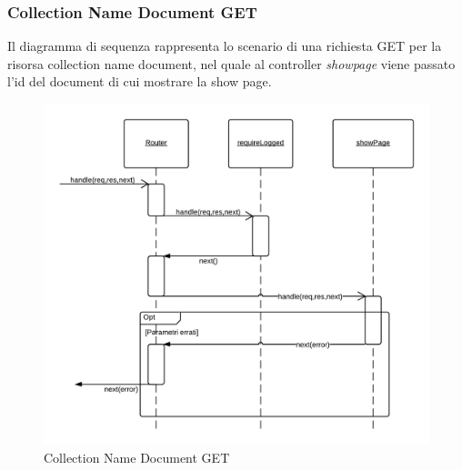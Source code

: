 \subsubsection{Collection Name Document GET} 
Il diagramma di sequenza rappresenta lo scenario di una richiesta GET per la risorsa collection name document, nel quale al controller \emph{showpage} viene passato l'id del document di cui mostrare la show page.
\begin{figure}[H]
	\begin{center} 
		\includegraphics[scale=0.20]{scenari/Collection Name Document GET.png} 
		\caption{Collection Name Document GET}
	\end{center} 
\end{figure}

